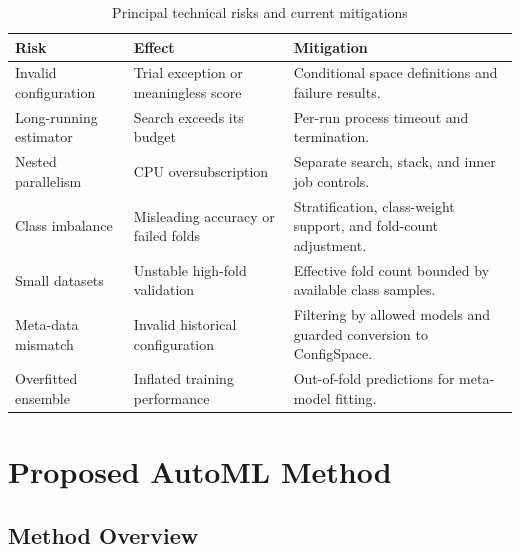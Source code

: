 \documentclass[12pt,a4paper,oneside]{report}
\begin{document}
\begin{table}[H]
\centering
\caption{Principal technical risks and current mitigations}
\label{tab:technical-risks}

\renewcommand{\arraystretch}{1.15}
\begin{tabularx}{\textwidth}
{
>{\raggedright\arraybackslash}p{}
>{\raggedright\arraybackslash}p{}
X
}
\toprule
\textbf{Risk} & \textbf{Effect} & \textbf{Mitigation} \\
\midrule

Invalid configuration &
Trial exception or meaningless score &
Conditional space definitions and failure results. \\

Long-running estimator &
Search exceeds its budget &
Per-run process timeout and termination. \\

Nested parallelism &
CPU oversubscription &
Separate search, stack, and inner job controls. \\

Class imbalance &
Misleading accuracy or failed folds &
Stratification, class-weight support, and fold-count adjustment. \\

Small datasets &
Unstable high-fold validation &
Effective fold count bounded by available class samples. \\

Meta-data mismatch &
Invalid historical configuration &
Filtering by allowed models and guarded conversion to ConfigSpace. \\

Overfitted ensemble &
Inflated training performance &
Out-of-fold predictions for meta-model fitting. \\

\bottomrule
\end{tabularx}
\end{table}

\chapter{Proposed AutoML Method}
\label{chap:method}

\section{Method Overview}
\end{document}
